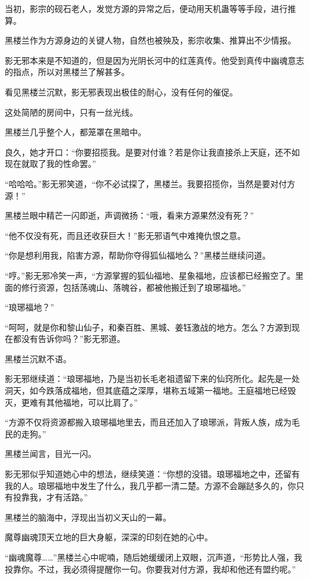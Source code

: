 \begin{this_body}
当初，影宗的砚石老人，发觉方源的异常之后，便动用天机蛊等等手段，进行推算。

黑楼兰作为方源身边的关键人物，自然也被殃及，影宗收集、推算出不少情报。

影无邪本来是不知道的，但是因为光阴长河中的红莲真传。他受到真传中幽魂意志的指点，所以对黑楼兰了解甚多。

看见黑楼兰沉默，影无邪表现出极佳的耐心，没有任何的催促。

这处简陋的房间中，只有一丝光线。

黑楼兰几乎整个人，都笼罩在黑暗中。

良久，她才开口：“你要招揽我。是要对付谁？若是你让我直接杀上天庭，还不如现在就取了我的性命罢。”

“哈哈哈。”影无邪笑道，“你不必试探了，黑楼兰。我要招揽你，当然是要对付方源！”

黑楼兰眼中精芒一闪即逝，声调微扬：“哦，看来方源果然没有死？”

“他不仅没有死，而且还收获巨大！”影无邪语气中难掩仇恨之意。

“你是想利用我，陷害方源，帮助你夺得狐仙福地么？”黑楼兰继续问道。

“哼。”影无邪冷笑一声，“方源掌握的狐仙福地、星象福地，应该都已经搬空了。里面的修行资源，包括荡魂山、落魄谷，都被他搬迁到了琅琊福地。”

“琅琊福地？”

“呵呵，就是你和黎山仙子，和秦百胜、黑城、姜钰激战的地方。怎么？方源到现在都没有告诉你吗？”影无邪道。

黑楼兰沉默不语。

影无邪继续道：“琅琊福地，乃是当初长毛老祖遗留下来的仙窍所化。起先是一处洞天，如今跌落成福地，但其底蕴之深厚，堪称五域第一福地。王庭福地已经毁灭，更难有其他福地，可以比肩了。”

“方源不仅将资源都搬入琅琊福地里去，而且还加入了琅琊派，背叛人族，成为毛民的走狗。”

黑楼兰闻言，目光一闪。

影无邪似乎知道她心中的想法，继续笑道：“你想的没错。琅琊福地之中，还留有我的人。琅琊福地中发生了什么，我几乎都一清二楚。方源不会蹦跶多久的，你只有投靠我，才有活路。”

黑楼兰的脑海中，浮现出当初义天山的一幕。

魔尊幽魂顶天立地的巨大身躯，深深的印刻在她的心中。

“幽魂魔尊……”黑楼兰心中呢喃，随后她缓缓闭上双眼，沉声道，“形势比人强，我投靠你。不过，我必须得提醒你一句。你要我对付方源，我却和他还有盟约呢。”


\end{this_body}
